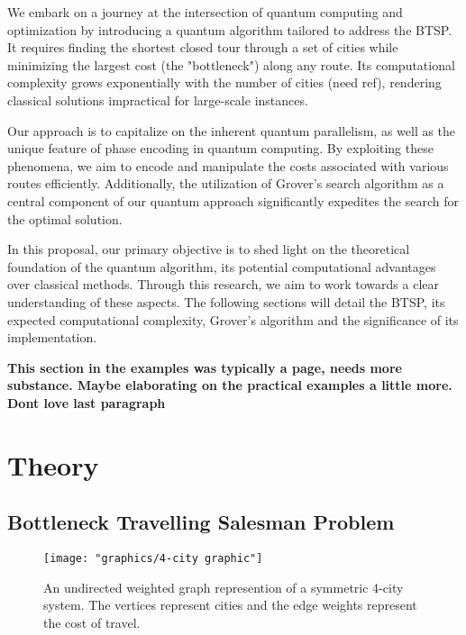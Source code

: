 \documentclass[twocolumn,showpacs,preprintnumbers,amsmath,amssymb]{revtex4}
\begin{document}
		We embark on a journey at the intersection of quantum computing and optimization by introducing a quantum algorithm tailored to address the BTSP. It requires finding the shortest closed tour through a set of cities while minimizing the largest cost (the "bottleneck") along any route. Its computational complexity grows exponentially with the number of cities (need ref), rendering classical solutions impractical for large-scale instances.
		
		Our approach is to capitalize on the inherent quantum parallelism, as well as the unique feature of phase encoding in quantum computing. By exploiting these phenomena, we aim to encode and manipulate the costs associated with various routes efficiently. Additionally, the utilization of Grover's search algorithm as a central component of our quantum approach significantly expedites the search for the optimal solution.
		
		In this proposal, our primary objective is to shed light on the theoretical foundation of the quantum algorithm, its potential computational advantages over classical methods. Through this research, we aim to work towards a clear understanding of these aspects. The following sections will detail the BTSP, its expected computational complexity, Grover's algorithm and the significance of its implementation.
		
		\textbf{This section in the examples was typically a page, needs more substance. Maybe elaborating on the practical examples a little more. Dont love last paragraph} 
		
		
		\section{Theory}
		
		\subsection{Bottleneck Travelling Salesman Problem}
		
		\begin{figure}[!h]
			\centering
			\texttt{[image: "graphics/4-city graphic"]}
			\caption{An undirected weighted graph represention of a  symmetric 4-city system.  The vertices represent cities and the edge weights represent the cost of travel. }
			\label{fig:4-city-graphic}
		\end{figure}		
		
		
		
\end{document}
